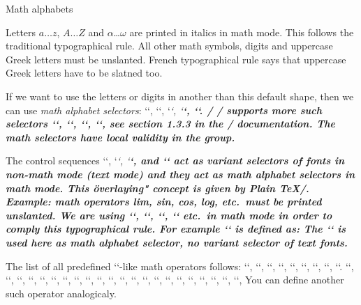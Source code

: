 \secc Math alphabets

Letters $a\dots z$, $A\dots Z$ and $\alpha$\dots$\omega$ are printed in italics
in math mode. This follows the traditional typographical rule. 
All other math symbols, digits and uppercase Greek letters must be
unslanted.\fnote
{French typographical rule says that uppercase Greek letters have to be
 slatned too.}

If we want to use the letters or digits 
in another than this default shape, then we can use
{\em math alphabet selectors}: `\mit`, `\rm`, `\it`, `\bf`, `\cal`.
\new \OpTeX/
\OpTeX/ supports more such selectors `\script`, `\frak`, `\bbchar`, `\bi`, see
section 1.3.3 in the \OpTeX/ documentation. The math selectors have local
validity in the group.

The control sequences `\rm`, `\it`, `\bf`, and `\bi` act as variant selectors
of fonts in non-math mode (text mode) and they act 
as math alphabet selectors in math mode. This \"overlaying" concept 
is given by Plain \TeX/. Example: math operators lim, sin, cos,
log, etc.\ must be printed unslanted. We are using `\lim`, `\sin`, `\cos`,
`\log` etc.\ in math mode in order to comply this typographical rule. For
example `\sin` is defined as:
\begtt
\def\sin {\mathop{\rm sin}\nolimits}
\endtt
The `\rm` is used here as math alphabet selector, no variant selector of
text fonts.

The list of all predefined `\rm`-like math operators follows: `\arccos`,
`\arcsin`, `\arctan`, `\arg`, `\cos`, `\cosh`, `\cot`, `\coth`, `\deg`.
`\det`, `\dim`, `\exp`, `\gcd`, `\hom`, `\inf`, `\ker`, `\lg`, `\lim`,
`\liminf`, `\limsup`, `\ln`, `\log`, `\max`, `\min`, `\Pr`, `\scs`, `\sin`,
`\sinh`, `\sup`, `\tan`, `\tanh`, You can define another such operator
analogicaly.


